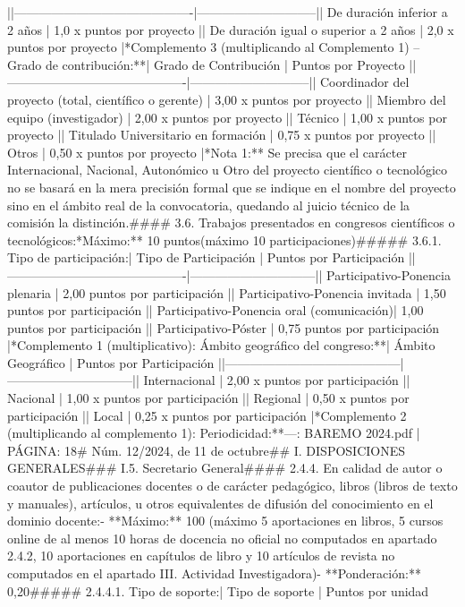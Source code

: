 \documentclass{article}
\begin{document}
\begin{itemize}
|\n|-------------------------------------------|-----------------------------|\n| De duración inferior a 2 años             | 1,0 x puntos por proyecto    |\n| De duración igual o superior a 2 años     | 2,0 x puntos por proyecto    |\n\n**Complemento 3 (multiplicando al Complemento 1) – Grado de contribución:**\n\n| Grado de Contribución                     | Puntos por Proyecto         |\n|-------------------------------------------|-----------------------------|\n| Coordinador del proyecto (total, científico o gerente) | 3,00 x puntos por proyecto |\n| Miembro del equipo (investigador)        | 2,00 x puntos por proyecto    |\n| Técnico                                   | 1,00 x puntos por proyecto    |\n| Titulado Universitario en formación       | 0,75 x puntos por proyecto    |\n| Otros                                     | 0,50 x puntos por proyecto    |\n\n**Nota 1:** Se precisa que el carácter Internacional, Nacional, Autonómico u Otro del proyecto científico o tecnológico no se basará en la mera precisión formal que se indique en el nombre del proyecto sino en el ámbito real de la convocatoria, quedando al juicio técnico de la comisión la distinción.\n\n#### 3.6. Trabajos presentados en congresos científicos o tecnológicos:\n**Máximo:** 10 puntos\n(máximo 10 participaciones)\n\n##### 3.6.1. Tipo de participación:\n\n| Tipo de Participación                     | Puntos por Participación     |\n|-------------------------------------------|------------------------------|\n| Participativo-Ponencia plenaria           | 2,00 puntos por participación  |\n| Participativo-Ponencia invitada           | 1,50 puntos por participación  |\n| Participativo-Ponencia oral (comunicación)| 1,00 puntos por participación  |\n| Participativo-Póster                      | 0,75 puntos por participación  |\n\n**Complemento 1 (multiplicativo): Ámbito geográfico del congreso:**\n\n| Ámbito Geográfico                        | Puntos por Participación     |\n|------------------------------------------|------------------------------|\n| Internacional                            | 2,00 x puntos por participación |\n| Nacional                                 | 1,00 x puntos por participación |\n| Regional                                 | 0,50 x puntos por participación |\n| Local                                    | 0,25 x puntos por participación |\n\n**Complemento 2 (multiplicando al complemento 1): Periodicidad:**\n\n---\n\nFUENTE: BAREMO 2024.pdf | PÁGINA: 18\n# Núm. 12/2024, de 11 de octubre\n\n## I. DISPOSICIONES GENERALES\n\n### I.5. Secretario General\n\n#### 2.4.4. En calidad de autor o coautor de publicaciones docentes o de carácter pedagógico, libros (libros de texto y manuales), artículos, u otros equivalentes de difusión del conocimiento en el dominio docente:\n- **Máximo:** 100 (máximo 5 aportaciones en libros, 5 cursos online de al menos 10 horas de docencia no oficial no computados en apartado 2.4.2, 10 aportaciones en capítulos de libro y 10 artículos de revista no computados en el apartado III. Actividad Investigadora)\n- **Ponderación:** 0,20\n\n##### 2.4.4.1. Tipo de soporte:\n| Tipo de soporte                                         | Puntos por unidad                     
\end{itemize}
\end{document}
